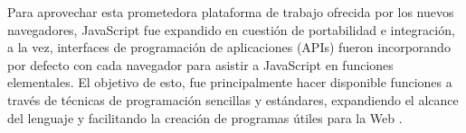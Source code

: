\documentclass[12pt, a4paper, titlepage]{report}
\begin{document}
			Para aprovechar esta prometedora plataforma de trabajo ofrecida por los nuevos navegadores, JavaScript fue expandido en cuestión de portabilidad e integración, a la vez, interfaces de programación de aplicaciones (APIs) fueron incorporando por defecto con cada navegador para asistir a JavaScript en funciones elementales. El objetivo de esto, fue principalmente hacer disponible funciones a través de técnicas de programación sencillas y estándares, expandiendo el alcance del lenguaje y facilitando la creación de programas útiles para la Web \cite{refElGranLibro}.

\end{document}
